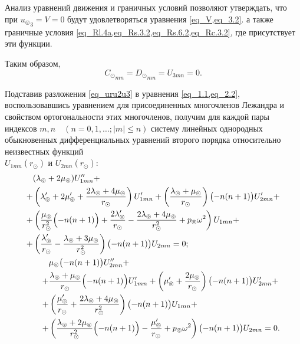 Анализ уравнений движения и граничных условий позволяют утверждать, что при ${u_\circledcirc}_3 = V = 0$ будут удовлетворяться уравнения \cref{eq_V,eq_3.2}. а также граничные условия \cref{eq_Rl.4a,eq_Rs.3.2,eq_Rs.6.2,eq_Rc.3.2}, где присутствует эти функции.

Таким образом, 
$$
{C_\odot}_{mn} = {D_\odot}_{mn} = U_{3mn} = 0.
$$

Подставив разложения \cref{eq_uru2u3} в уравнения \cref{eq_1.1,eq_2.2}, воспользовавшись уравнением для присоединенных многочленов Лежандра и свойством ортогональности этих многочленов, получим для каждой пары индексов $m,n \quad(n = 0,1,\ldots; \lvert m\rvert\leq n)$ систему линейных однородных обыкновенных дифференциальных уравнений второго порядка относительно неизвестных функций \\ $U_{1mn}(r_\odot)$ и $ U_{2mn}(r_\odot):$ 
\begin{align}
\begin{split}
&(\lambda_\circledcirc + 2\mu_\circledcirc)U_{1mn}'' + \\
+ &\left(\lambda_\circledcirc'+2\mu_\circledcirc' + \frac{2\lambda_\circledcirc+4\mu_\circledcirc}{r_\odot}\right)U_{1mn}' + \left(\frac{\lambda_\circledcirc+\mu_\circledcirc}{r_\odot}\right)\bigl(-n(n+1)\bigr)U_{2mn}' + \\
+ &\left(\frac{\mu_\circledcirc}{r_\odot^2}\Bigl(-n(n+1)\Bigr) + \frac{2\lambda_\circledcirc'}{r_\odot} - \frac{2\lambda_\circledcirc + 4\mu_\circledcirc}{r_\odot^2} + p_\circledcirc\omega^2\right)U_{1mn} + \\
+ &\left(\frac{\lambda_\circledcirc'}{r_\odot} - \frac{\lambda_\circledcirc+3\mu_\circledcirc}{r_\odot^2}\right)\bigl(-n(n+1)\bigr)U_{2mn} = 0;
\end{split}\label{eq_final_1}\\
\begin{split}
&\mu_\circledcirc\bigl(-n(n+1)\bigr)U_{2mn}'' +\\
+ &\frac{\lambda_\circledcirc+\mu_\circledcirc}{r_\odot}\Bigl(-n(n+1)\Bigr)U_{1mn}' + \left(\mu_\circledcirc'+\frac{2\mu_\circledcirc}{r_\odot}\right)\bigl(-n(n+1)\bigr)U_{2mn}' + \\
+ &\left(\frac{\mu_\circledcirc'}{r_\odot} + \frac{2\lambda_\circledcirc+4\mu_\circledcirc}{r_\odot^2}\right)\bigl(-n(n+1)\bigr)U_{1mn} + \\
+ &\left(\frac{\lambda_\circledcirc+2\mu_\circledcirc}{r_\odot^2}\Bigl(-n(n+1)\Bigr) - \frac{\mu_\circledcirc'}{r_\odot} + p_\circledcirc\omega^2\right)\bigl(-n(n+1)\bigr)U_{2mn} = 0.
\end{split}\label{eq_final_2}
\end{align}

